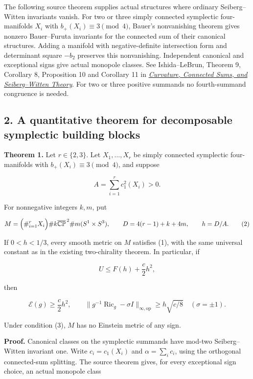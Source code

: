 \documentclass[
  11pt,
]{article}
\begin{document}
The following source theorem supplies actual structures where ordinary
Seiberg--Witten invariants vanish. For two or three simply connected
symplectic four-manifolds \(X_i\) with \(b_+(X_i)\equiv3\pmod4\),
Bauer's nonvanishing theorem gives nonzero Bauer--Furuta invariants for
the connected sum of their canonical structures. Adding a manifold with
negative-definite intersection form and determinant square \(-b_2\)
preserves this nonvanishing. Independent canonical and exceptional signs
give actual monopole classes. See Ishida--LeBrun, Theorem 9, Corollary
8, Proposition 10 and Corollary 11 in
\href{https://arxiv.org/html/math/0111228}{\emph{Curvature, Connected
Sums, and Seiberg--Witten Theory}}. For two or three positive summands
no fourth-summand congruence is needed.

\hypertarget{a-quantitative-theorem-for-decomposable-symplectic-building-blocks}{%
\subsection{2. A quantitative theorem for decomposable symplectic
building
blocks}\label{a-quantitative-theorem-for-decomposable-symplectic-building-blocks}}

\textbf{Theorem 1.} Let \(r\in\{2,3\}\). Let \(X_1,\ldots,X_r\) be
simply connected symplectic four-manifolds with
\(b_+(X_i)\equiv3\pmod4\), and suppose

\[
 A=\sum_{i=1}^r c_1^2(X_i)>0.
\]

For nonnegative integers \(k,m\), put

\[
 M=\Bigl(\#_{i=1}^r X_i\Bigr)
       \# k\overline{\mathbb{CP}}^{\,2}
       \# m(S^1\times S^3),\qquad
 D=4(r-1)+k+4m,\qquad h=D/A.
 \tag{2}
\]

If \(0<h<1/3\), every smooth metric on \(M\) satisfies (1), with the
same universal constant as in the existing two-chirality theorem. In
particular, if

\[
 U\le F(h)+\frac c2h^2,
 \tag{3}
\]

then

\[
 \mathcal E(g)\ge\frac c2h^2,
 \qquad
 \|g^{-1}\operatorname{Ric}_g-\sigma I\|_{\infty,\mathrm{op}}
       \ge h\sqrt{c/8}\quad(\sigma=\pm1).
 \tag{4}
\]

Under condition (3), \(M\) has no Einstein metric of any sign.

\textbf{Proof.} Canonical classes on the symplectic summands have
mod-two Seiberg--Witten invariant one. Write \(c_i=c_1(X_i)\) and
\(\alpha=\sum_i c_i\), using the orthogonal connected-sum splitting. The
source theorem gives, for every exceptional sign choice, an actual
monopole class
\end{document}
